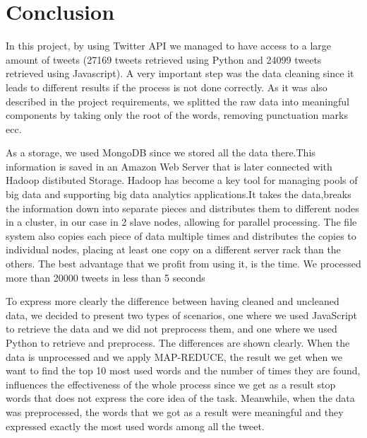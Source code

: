 \documentclass{article}
\begin{document}
        \section{Conclusion}
In this project, by using Twitter API we managed to have access to a large amount of tweets (27169 tweets retrieved using Python and 24099 tweets retrieved using Javascript). A very important step was the data cleaning since it leads to different results if the process is not done correctly. As it was also described in the project requirements, we splitted the raw data into meaningful components by taking only the root of the words, removing punctuation marks ecc.

 As a storage, we used MongoDB since we stored all the data there.This information is saved in an Amazon Web Server that is later connected with Hadoop distibuted Storage. Hadoop has become a key tool for managing pools of big data and supporting big data analytics applications.It takes the data,breaks the information down into separate pieces and distributes them to different nodes in a cluster, in our case in 2 slave nodes, allowing for parallel processing. The file system also copies each piece of data multiple times and distributes the copies to individual nodes, placing at least one copy on a different server rack than the others. The best advantage that we profit from using it, is the time. We processed more than 20000 tweets in less than 5 seconds

To express more clearly the difference between having cleaned and uncleaned data, we decided to present two types of scenarios, one where we used JavaScript to retrieve the data and we did not preprocess them, and one where we used Python to retrieve and preprocess. The differences are shown clearly. When the data is unprocessed and we apply MAP-REDUCE, the result we get when we want to find the top 10 most used words and the number of times they are found, influences the effectiveness of the whole process since we get as a result stop words that does not express the core idea of the task. Meanwhile, when the data was preprocessed, the words that we got as a result were meaningful and they expressed exactly the most used words among all the tweet.


      
    
    
    \nocite{*}
\end{document}
